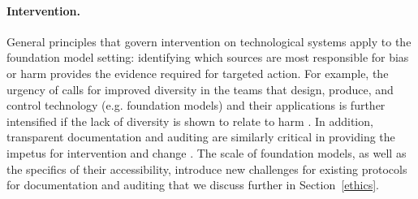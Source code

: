 \paragraph{Intervention.}
General principles that govern intervention on technological systems apply to the foundation model setting: identifying which sources are most responsible for bias or harm provides the evidence required for targeted action. For example, the urgency of calls for improved diversity in the teams that design, produce, and control technology (e.g. foundation models) and their applications \citep{Longino1990, Harding2015, Nielsen2017, oconnor2019, Hofstra2020, Katell2020} is further intensified if the lack of diversity is shown to relate to harm \citep{caswell2021}. In addition, transparent documentation \citep[e.g. ][]{gebru2018datasheets, bender2018data, Mitchell_2019} and auditing \citep[e.g. ][]{raji2019} are similarly critical in providing the impetus for intervention and change \citep{Burrell2016, Lipton2018, Creel2020, Raji2020, Wilson2021}. The scale of foundation models, as well as the specifics of their accessibility, introduce new challenges for existing protocols for documentation and auditing that we discuss further in Section~\ref{ethics}.

